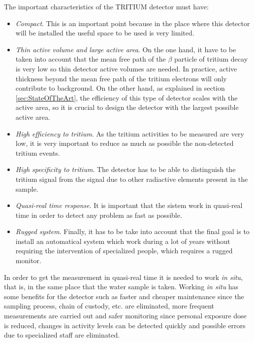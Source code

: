 The important characteristics of the TRITIUM detector must have:

\begin{itemize}

\item{} \textit{Compact}. This is an important point because in the place where this detector will be installed the useful space to be used is very limited.

\item{} \textit{Thin active volume and large active area}. On the one hand, it have to be taken into account that the mean free path of the $\beta$ particle of tritium decay is very low so thin detector active volumes are needed. In practice, active thickness beyond the mean free path of the tritium electrons will only contribute to background. On the other hand, as explained in section \ref{sec:StateOfTheArt}, the efficiency of this type of detector scales with the active area, so it is crucial to design the detector with the largest possible active area.

\item{} \textit{High efficiency to tritium}. As the tritium activities to be measured are very low, it is very important to reduce as much as possible the non-detected tritium events.

\item{} \textit{High specificity to tritium}. The detector has to be able to distinguish the tritium signal from the signal due to other radiactive elements present in the sample.

\item{} \textit{Quasi-real time response}. It is important that the sistem work in quasi-real time in order to detect any problem as fast as possible. 

\item{} \textit{Rugged system}. Finally, it has to be take into account that the final goal is to install an automatical system which work during a lot of years without requiring the intervention of specialized people, which requires a rugged monitor. 

\end{itemize}

In order to get the measurement in quasi-real time it is needed to work \textit{in situ}, that is, in the same place that the water sample is taken. Working \textit{in situ} has some benefits for the detector such as faster and cheaper maintenance since the sampling process, chain of custody, etc. are eliminated, more frequent measurements are carried out and safer monitoring since personal exposure dose is reduced, changes in activity levels can be detected quickly and possible errors due to specialized staff are eliminated.


